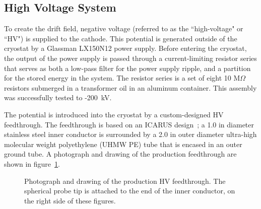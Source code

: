 %
\subsection{High Voltage System}
\label{sec:hv}

To create the drift field, negative voltage (referred to as the ``high-voltage" or ``HV") is supplied to the \lartpc cathode.  This potential is generated outside of the cryostat by a Glassman LX150N12 power supply.  Before entering the cryostat, the output of the power supply is passed through a current-limiting resistor series that serves as both a low-pass filter for the power supply ripple, and a partition for the stored energy in the system.  The resistor series is a set of eight 10 M$\Omega$ resistors submerged in a transformer oil in an aluminum container.  This assembly was successfully tested to -200~kV. 

The potential is introduced into the cryostat by a custom-designed HV feedthrough.  The feedthrough is based on an ICARUS design~\cite{Amerio:2004-T600}; a 1.0 in diameter stainless steel inner conductor is surrounded by a 2.0 in outer diameter ultra-high molecular weight polyethylene (UHMW PE) tube that is encased in an outer ground tube.  A photograph and drawing of the production feedthrough are shown in figure~\ref{fig:hv_ftpic}.

\begin{figure}[htb]
\caption{Photograph and drawing of the production HV feedthrough. The spherical probe tip is attached to the end of the inner conductor, on the right side of these figures.}
\label{fig:hv_ftpic}
\end{figure}

